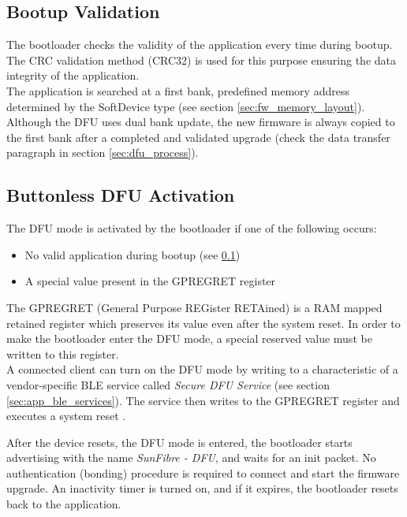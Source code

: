         
    \subsection{Bootup Validation}
        \label{sec:bootup_validation}
        The bootloader checks the validity of the application every time during bootup. The CRC validation method (CRC32) is used for this purpose ensuring the data integrity of the application.\\
        The application is searched at a first bank, predefined memory address determined by the SoftDevice type (see section \ref{sec:fw_memory_layout}). Although the DFU uses dual bank update, the new firmware is always copied to the first bank after a completed and validated upgrade (check the data transfer paragraph in section \ref{sec:dfu_process}).
        
        
    \subsection{Buttonless DFU Activation}
        \label{sec:buttonless_activation}
        The DFU mode is activated by the bootloader if one of the following occurs:
        \begin{itemize}
            \item No valid application during bootup (see \ref{sec:bootup_validation})
            \item A special value present in the GPREGRET register
        \end{itemize}
        
        The GPREGRET (General Purpose REGister RETAined) is a RAM mapped retained register which preserves its value even after the system reset. In order to make the bootloader enter the DFU mode, a special reserved value must be written to this register.\\
        A connected client can turn on the DFU mode by writing to a characteristic of a vendor-specific BLE service called \textit{Secure DFU Service} (see section \ref{sec:app_ble_services}). The service then writes to the GPREGRET register and executes a system reset \cite{nrf52doc:secure_dfu_service}.

        After the device resets, the DFU mode is entered, the bootloader starts advertising with the name \textit{SunFibre - DFU}, and waits for an init packet. No authentication (bonding) procedure is required to connect and start the firmware upgrade. An inactivity timer is turned on, and if it expires, the bootloader resets back to the application. 
        
